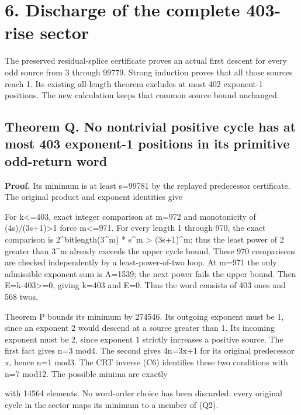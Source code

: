 \section{6. Discharge of the complete 403-rise sector}

The preserved residual-splice certificate proves an actual first descent
for every odd source from 3 through 99779. Strong induction proves that
all those sources reach 1. Its existing all-length theorem excludes at
most 402 exponent-1 positions. The new calculation keeps that common
source bound unchanged.

\subsection{Theorem Q. No nontrivial positive cycle has at most 403
exponent-1 positions in its primitive odd-return word}

\textbf{Proof.} Its minimum is at least s=99781 by the replayed
predecessor certificate. The original product and exponent identities
give


For k\textless=403, exact integer comparison at m=972 and monotonicity
of (4s)/(3s+1)\textgreater1 force m\textless=971. For every length 1
through 970, the exact comparison is 2\^{}bitlength(3\^{}m) * s\^{}m
\textgreater{} (3s+1)\^{}m; thus the least power of 2 greater than
3\^{}m already exceeds the upper cycle bound. These 970 comparisons are
checked independently by a least-power-of-two loop. At m=971 the only
admissible exponent sum is A=1539; the next power fails the upper bound.
Then E=k-403\textgreater=0, giving k=403 and E=0. Thus the word consists
of 403 ones and 568 twos.

Theorem P bounds its minimum by 274546. Its outgoing exponent must be 1,
since an exponent 2 would descend at a source greater than 1. Its
incoming exponent must be 2, since exponent 1 strictly increases a
positive source. The first fact gives n=3 mod4. The second gives 4n=3x+1
for its original predecessor x, hence n=1 mod3. The CRT inverse (C6)
identifies these two conditions with n=7 mod12. The possible minima are
exactly


with 14564 elements. No word-order choice has been discarded: every
original cycle in the sector maps its minimum to a member of (Q2).

